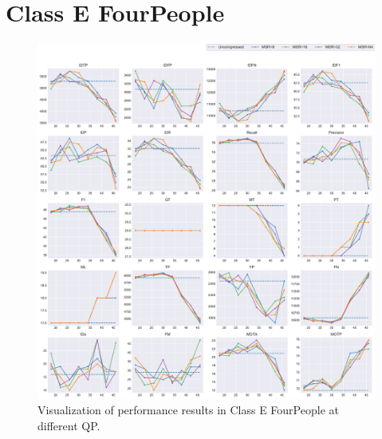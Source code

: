 
\section{Class E FourPeople}
\label{sec:appendix/FourPeople_all}


\begin{figure}[!htbp]
\centering
\includegraphics[width=1.0\linewidth]{img/appendix/FourPeople_all_multiplots_qp.pdf}
\caption[Visualization of performance results in Class E FourPeople at different QP]
{Visualization of performance results in Class E FourPeople at different QP.}
\label{fig:FourPeople_all_qp}
\end{figure}


